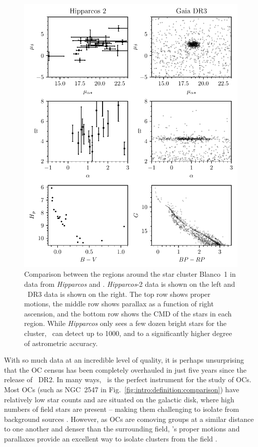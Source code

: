 \begin{figure}[p]
	\centering
	\includegraphics[width=\textwidth]{fig/c1/gaia_hipparcos_oc_comparison.pdf}
	\caption[Comparison between the regions around the star cluster Blanco~1 in data from \emph{Hipparcos} and \gaia]{Comparison between the regions around the star cluster Blanco~1 in data from \emph{Hipparcos} and \gaia. \emph{Hipparcos}-2 data \citep{vanleeuwen_hipparcos_new_2007} is shown on the left and \gaia\ DR3 data \citep{gaia_collaboration_gaia_2022} is shown on the right. The top row shows proper motions, the middle row shows parallax as a function of right ascension, and the bottom row shows the CMD of the stars in each region. While \emph{Hipparcos} only sees a few dozen bright stars for the cluster, \gaia\ can detect up to 1000, and to a significantly higher degree of astrometric accuracy.}
	\label{fig:intro:history:gaia_blanco_1}
\end{figure}

With so much data at an incredible level of quality, it is perhaps unsurprising that the OC census has been completely overhauled in just five years since the release of \gaia\ DR2. In many ways, \gaia\ is the perfect instrument for the study of OCs. Most OCs (such as NGC~2547 in Fig.~\ref{fig:intro:definition:comparison}) have relatively low star counts and are situated on the galactic disk, where high numbers of field stars are present -- making them challenging to isolate from background sources \citep{kharchenko_global_2012}. However, as OCs are comoving groups at a similar distance to one another and denser than the surrounding field, \gaia's proper motions and parallaxes provide an excellent way to isolate clusters from the field \citep{cantat-gaudin_characterising_2018}.

